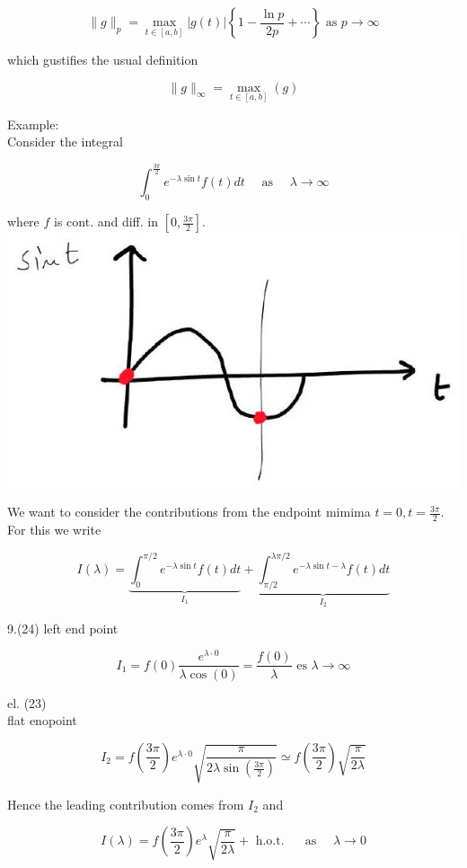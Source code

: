 \documentclass[10pt]{article}
\begin{document}
$$
\|g\|_{p}=\max _{t \in[a, b]}|g(t)|\left\{1-\frac{\ln p}{2 p}+\cdots\right\} \text { as } p \rightarrow \infty
$$

which gustifies the usual definition

$$
\|g\|_{\infty}=\max _{t \in[a, b]}(g)
$$

Example:\\
Consider the integral

$$
\int_{0}^{\frac{3 \pi}{2}} e^{-\lambda \sin t} f(t) d t \quad \text { as } \quad \lambda \rightarrow \infty
$$

where $f$ is cont. and diff. in $\left[0, \frac{3 \pi}{2}\right]$.\\
\includegraphics[max width=\textwidth, center]{2025_10_19_11b40f5928aca93f9d20g-3}

We want to consider the contributions from the endpoint mimima $t=0, t=\frac{3 \pi}{2}$. For this we write

$$
I(\lambda)=\underbrace{\int_{0}^{\pi / 2} e^{-\lambda \sin t} f(t) d t}_{I_{1}}+\underbrace{\int_{\pi / 2}^{\lambda \pi / 2} e^{-\lambda \sin t-\lambda} f(t) d t}_{I_{2}}
$$

9.(24) left end point

$$
I_{1}=f(0) \frac{e^{\lambda \cdot 0}}{\lambda \cos (0)}=\frac{f(0)}{\lambda} \text { es } \lambda \rightarrow \infty
$$

el. (23)\\
flat enopoint

$$
I_{2}=f\left(\frac{3 \pi}{2}\right) e^{\lambda \cdot 0} \sqrt{\frac{\pi}{2 \lambda \sin \left(\frac{3 \pi}{2}\right)}} \simeq f\left(\frac{3 \pi}{2}\right) \sqrt{\frac{\pi}{2 \lambda}}
$$

Hence the leading contribution comes from $I_{2}$ and

$$
I(\lambda)=f\left(\frac{3 \pi}{2}\right) e^{\lambda} \sqrt{\frac{\pi}{2 \lambda}}+\text { h.o.t. } \quad \text { as } \quad \lambda \rightarrow 0
$$
\end{document}
